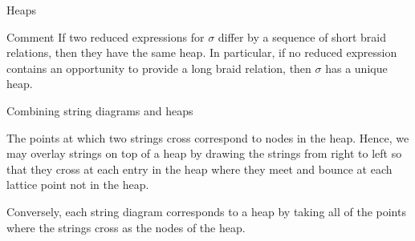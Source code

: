 \documentclass[9pt]{beamer}
\begin{document}
\begin{frame}{Heaps}
\begin{example}
\end{example}
\begin{block}{Comment}
If two reduced expressions for $\sigma$ differ by a sequence of short braid relations, then they have the same heap.  In particular, if no reduced expression contains an opportunity to provide a long braid relation, then $\sigma$ has a unique heap.
\end{block}

\end{frame}


\begin{frame}{Combining string diagrams and heaps}

The points at which two strings cross correspond to nodes in the heap. Hence, we may overlay strings on top of a heap by drawing the strings from right to left so that they cross at each entry in the heap where they meet and bounce at each lattice point not in the heap. 

\vspace{1em}

Conversely, each string diagram corresponds to a heap by taking all of the points where the strings cross as the nodes of the heap.


\begin{example}
\begin{figure}
\end{figure}
\end{example}

\end{frame}
\end{document}
